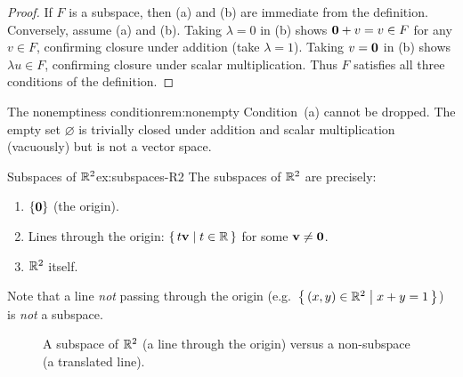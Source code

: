 \begin{proof}
If $F$ is a subspace, then (a) and (b) are immediate from the definition.
Conversely, assume (a) and (b). Taking $\lambda = 0$ in (b) shows
$\mathbf{0} + v = v\in F$ for any $v\in F$, confirming closure under
addition (take $\lambda=1$). Taking $v = \mathbf{0}$ in (b) shows
$\lambda u\in F$, confirming closure under scalar multiplication. Thus
$F$ satisfies all three conditions of the definition.
\end{proof}

\begin{remark}{The nonemptiness condition}{rem:nonempty}
Condition~(a) cannot be dropped. The empty set $\varnothing$ is trivially
closed under addition and scalar multiplication (vacuously) but is not a
vector space.
\end{remark}

\begin{example}{Subspaces of ${\mathbb{R}}^2$}{ex:subspaces-R2}
The subspaces of ${\mathbb{R}}^2$ are precisely:
\begin{enumerate}[label=(\roman*)]
  \item $\left\{\mathbf{0}\right\}$ (the origin).
  \item Lines through the origin: $\left\{\,t\mathbf{v}\;\middle|\;t\in{\mathbb{R}}\,\right\}$ for
    some $\mathbf{v}\neq\mathbf{0}$.
  \item ${\mathbb{R}}^2$ itself.
\end{enumerate}
Note that a line \emph{not} passing through the origin (e.g.\
$\left\{\,(x,y)\in{\mathbb{R}}^2\;\middle|\;x+y=1\,\right\}$) is \emph{not} a subspace.
\end{example}

\begin{figure}[ht]
\centering
{}
\caption{A subspace of ${\mathbb{R}}^2$ (a line through the origin) versus a
non-subspace (a translated line).}
\label{fig:subspace-R2}
\end{figure}

